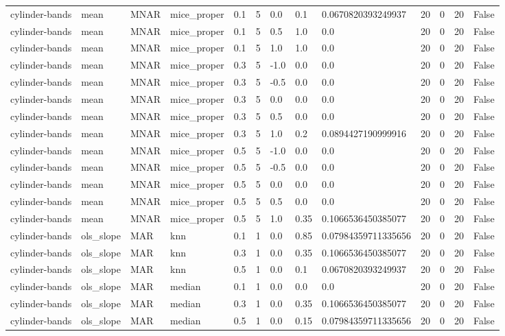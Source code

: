 \begin{tabular}{lllllllllllll}
cylinder-bands & mean & MNAR & mice\_proper & 0.1 & 5 & 0.0 & 0.1 & 0.0670820393249937 & 20 & 0 & 20 & False \\
cylinder-bands & mean & MNAR & mice\_proper & 0.1 & 5 & 0.5 & 1.0 & 0.0 & 20 & 0 & 20 & False \\
cylinder-bands & mean & MNAR & mice\_proper & 0.1 & 5 & 1.0 & 1.0 & 0.0 & 20 & 0 & 20 & False \\
cylinder-bands & mean & MNAR & mice\_proper & 0.3 & 5 & -1.0 & 0.0 & 0.0 & 20 & 0 & 20 & False \\
cylinder-bands & mean & MNAR & mice\_proper & 0.3 & 5 & -0.5 & 0.0 & 0.0 & 20 & 0 & 20 & False \\
cylinder-bands & mean & MNAR & mice\_proper & 0.3 & 5 & 0.0 & 0.0 & 0.0 & 20 & 0 & 20 & False \\
cylinder-bands & mean & MNAR & mice\_proper & 0.3 & 5 & 0.5 & 0.0 & 0.0 & 20 & 0 & 20 & False \\
cylinder-bands & mean & MNAR & mice\_proper & 0.3 & 5 & 1.0 & 0.2 & 0.0894427190999916 & 20 & 0 & 20 & False \\
cylinder-bands & mean & MNAR & mice\_proper & 0.5 & 5 & -1.0 & 0.0 & 0.0 & 20 & 0 & 20 & False \\
cylinder-bands & mean & MNAR & mice\_proper & 0.5 & 5 & -0.5 & 0.0 & 0.0 & 20 & 0 & 20 & False \\
cylinder-bands & mean & MNAR & mice\_proper & 0.5 & 5 & 0.0 & 0.0 & 0.0 & 20 & 0 & 20 & False \\
cylinder-bands & mean & MNAR & mice\_proper & 0.5 & 5 & 0.5 & 0.0 & 0.0 & 20 & 0 & 20 & False \\
cylinder-bands & mean & MNAR & mice\_proper & 0.5 & 5 & 1.0 & 0.35 & 0.1066536450385077 & 20 & 0 & 20 & False \\
cylinder-bands & ols\_slope & MAR & knn & 0.1 & 1 & 0.0 & 0.85 & 0.07984359711335656 & 20 & 0 & 20 & False \\
cylinder-bands & ols\_slope & MAR & knn & 0.3 & 1 & 0.0 & 0.35 & 0.1066536450385077 & 20 & 0 & 20 & False \\
cylinder-bands & ols\_slope & MAR & knn & 0.5 & 1 & 0.0 & 0.1 & 0.0670820393249937 & 20 & 0 & 20 & False \\
cylinder-bands & ols\_slope & MAR & median & 0.1 & 1 & 0.0 & 0.0 & 0.0 & 20 & 0 & 20 & False \\
cylinder-bands & ols\_slope & MAR & median & 0.3 & 1 & 0.0 & 0.35 & 0.1066536450385077 & 20 & 0 & 20 & False \\
cylinder-bands & ols\_slope & MAR & median & 0.5 & 1 & 0.0 & 0.15 & 0.07984359711335656 & 20 & 0 & 20 & False \\

\end{tabular}
